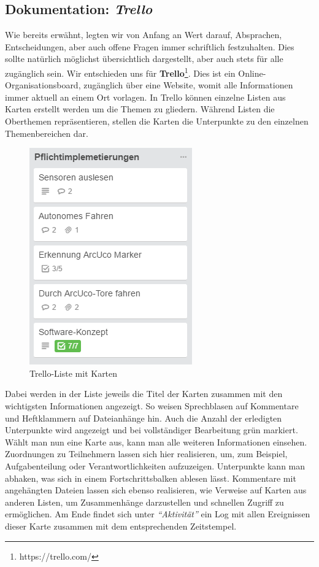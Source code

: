 \subsection{Dokumentation: \textit{Trello}}
Wie bereits erwähnt, legten wir von Anfang an Wert darauf, Absprachen, Entscheidungen, aber auch offene Fragen immer schriftlich festzuhalten. Dies sollte natürlich möglichst übersichtlich dargestellt, aber auch stets für alle zugänglich sein. Wir entschieden uns für \textbf{Trello}\footnote[1]{https://trello.com/}. Dies ist ein Online-Organisationsboard, zugänglich über eine Website, womit alle Informationen immer aktuell an einem Ort vorlagen. In Trello können einzelne Listen aus Karten erstellt werden um die Themen zu gliedern. Während Listen die Oberthemen repräsentieren, stellen die Karten die Unterpunkte zu den einzelnen Themenbereichen dar.
\begin{figure}[hp] 
  \centering
     \includegraphics{images/PflichtimplementierungenListe.PNG}
  \caption{Trello-Liste mit Karten}
  \label{fig:Trello-Liste}
\end{figure}
\newline
Dabei werden in der Liste jeweils die Titel der Karten zusammen mit den wichtigsten Informationen angezeigt. So weisen Sprechblasen auf Kommentare und Heftklammern auf Dateianhänge hin. Auch die Anzahl der erledigten Unterpunkte wird angezeigt und bei vollständiger Bearbeitung grün markiert.
\pagebreak \newline
Wählt man nun eine Karte aus, kann man alle weiteren Informationen einsehen. Zuordnungen zu Teilnehmern lassen sich hier realisieren, um, zum Beispiel, Aufgabenteilung oder Verantwortlichkeiten aufzuzeigen. Unterpunkte kann man abhaken, was sich in einem Fortschrittsbalken ablesen lässt. Kommentare mit angehängten Dateien lassen sich ebenso realisieren, wie Verweise auf Karten aus anderen Listen, um Zusammenhänge darzustellen und schnellen Zugriff zu ermöglichen. Am Ende findet sich unter \textit{"`Aktivität"'} ein Log mit allen Ereignissen dieser Karte zusammen mit dem entsprechenden Zeitstempel.

